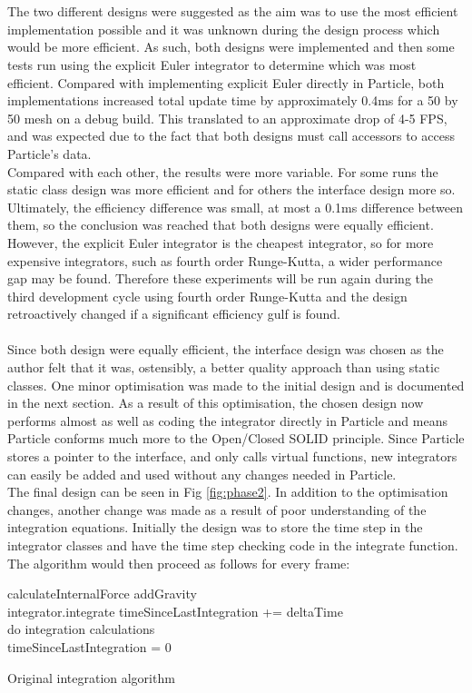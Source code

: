 \\\\The two different designs were suggested as the aim was to use the most efficient implementation possible and it was unknown during the design process which would be more efficient. As such, both designs were implemented and then some tests run using the explicit Euler integrator to determine which was most efficient. Compared with implementing explicit Euler directly in Particle, both implementations increased total update time by approximately 0.4ms for a 50 by 50 mesh on a debug build. This translated to an approximate drop of 4-5 FPS, and was expected due to the fact that both designs must call accessors to access Particle's data.
\\Compared with each other, the results were more variable. For some runs the static class design was more efficient and for others the interface design more so. Ultimately, the efficiency difference was small, at most a 0.1ms difference between them, so the conclusion was reached that both designs were equally efficient. However, the explicit Euler integrator is the cheapest integrator, so for more expensive integrators, such as fourth order Runge-Kutta, a wider performance gap may be found. Therefore these experiments will be run again during the third development cycle using fourth order Runge-Kutta and the design retroactively changed if a significant efficiency gulf is found.
\\\\Since both design were equally efficient, the interface design was chosen as the author felt that it was, ostensibly, a better quality approach than using static classes. One minor optimisation was made to the initial design and is documented in the next section. As a result of this optimisation, the chosen design now performs almost as well as coding the integrator directly in Particle and means Particle conforms much more to the Open/Closed SOLID principle. Since Particle stores a pointer to the interface, and only calls virtual functions, new integrators can easily be added and used without any changes needed in Particle. 
\\The final design can be seen in Fig \ref{fig:phase2}. In addition to the optimisation changes, another change was made as a result of poor understanding of the integration equations. Initially the design was to store the time step in the integrator classes and have the time step checking code in the integrate function. The algorithm would then proceed as follows for every frame:
\begin{algorithm}[h]
  \SetAlgoLined
  \SetNoFillComment
   {
    calculateInternalForce
  }
   {
    addGravity
    \\integrator.integrate
  }
  timeSinceLastIntegration += deltaTime
  \\ {
    do integration calculations
    \\timeSinceLastIntegration = 0
  }
  \caption{Original integration algorithm}
\end{algorithm}
